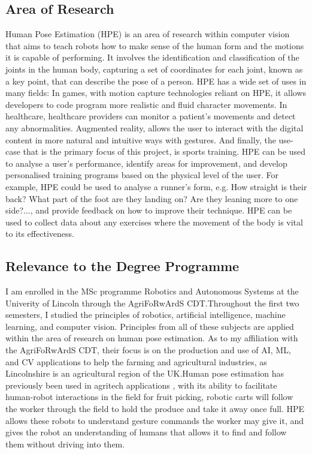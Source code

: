 \documentclass[runningheads]{llncs}
\begin{document}
    \subsection{Area of Research}
        Human Pose Estimation (HPE) is an area of research within computer vision that aims to teach robots how to make sense of the human form and the motions it is capable of performing. It involves the identification and classification of the joints in the human body, capturing a set of coordinates for each joint, known as a key point, that can describe the pose of a person. HPE has a wide set of uses in many fields: In games, with motion capture technologies reliant on HPE, it allows developers to code program more realistic and fluid character movements. In healthcare, healthcare providers can monitor a patient's movements and detect any abnormalities. Augmented reality, allows the user to interact with the digital content in more natural and intuitive ways with gestures. And finally, the use-case that is the primary focus of this project, is sports training. HPE can be used to analyse a user's performance, identify areas for improvement, and develop personalised training programs based on the physical level of the user. For example, HPE could be used to analyse a runner's form, e.g. How straight is their back? What part of the foot are they landing on? Are they leaning more to one side?..., and provide feedback on how to improve their technique. HPE can be used to collect data about any exercises where the movement of the body is vital to its effectiveness.
    
    \subsection{Relevance to the Degree Programme}
        I am enrolled in the MSc programme Robotics and Autonomous Systems at the Univerity of Lincoln through the AgriFoRwArdS CDT.\@ Throughout the first two semesters, I studied the principles of robotics, artificial intelligence, machine learning, and computer vision. Principles from all of these subjects are applied within the area of research on human pose estimation. As to my affiliation with the AgriFoRwArdS CDT, their focus is on the production and use of AI, ML, and CV applications to help the farming and agricultural industries, as Lincolnshire is an agricultural region of the UK.\@ Human pose estimation has previously been used in agritech applications \parencite{app12168160}, with its ability to facilitate human-robot interactions in the field for fruit picking, robotic carts will follow the worker through the field to hold the produce and take it away once full. HPE allows these robots to understand gesture commands the worker may give it, and gives the robot an understanding of humans that allows it to find and follow them without driving into them.
        
\end{document}
